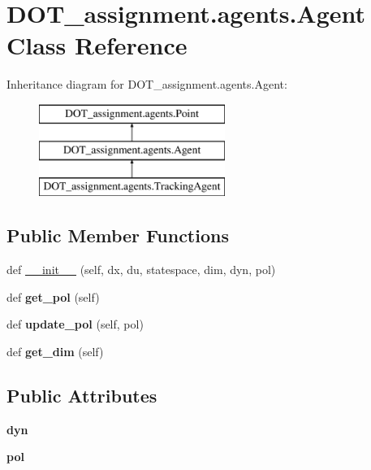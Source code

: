 \hypertarget{class_d_o_t__assignment_1_1agents_1_1_agent}{}\section{D\+O\+T\+\_\+assignment.\+agents.\+Agent Class Reference}
\label{class_d_o_t__assignment_1_1agents_1_1_agent}
Inheritance diagram for D\+O\+T\+\_\+assignment.\+agents.\+Agent\+:\begin{figure}[H]
\begin{center}
\leavevmode
\includegraphics[height=3.000000cm]{class_d_o_t__assignment_1_1agents_1_1_agent}
\end{center}
\end{figure}
\subsection*{Public Member Functions}
\begin{DoxyCompactItemize}
\item 
def \mbox{\hyperlink{class_d_o_t__assignment_1_1agents_1_1_agent_a243feb66a55d2a2733464276db763fc3}{\+\_\+\+\_\+init\+\_\+\+\_\+}} (self, dx, du, statespace, dim, dyn, pol)
\item 
\mbox{\label{class_d_o_t__assignment_1_1agents_1_1_agent_af718808f9100549cdd31fbc0b48e06f0}} 
def {\bfseries get\+\_\+pol} (self)
\item 
\mbox{\label{class_d_o_t__assignment_1_1agents_1_1_agent_a85c6b89b354a7ae61b6838b180cebe60}} 
def {\bfseries update\+\_\+pol} (self, pol)
\item 
\mbox{\label{class_d_o_t__assignment_1_1agents_1_1_agent_aa1e9d1f9f704c4016f62d907e0650877}} 
def {\bfseries get\+\_\+dim} (self)
\end{DoxyCompactItemize}
\subsection*{Public Attributes}
\begin{DoxyCompactItemize}
\item 
\mbox{\label{class_d_o_t__assignment_1_1agents_1_1_agent_ae35afbe26e60491eca55678d317dd72d}} 
{\bfseries dyn}
\item 
\mbox{\label{class_d_o_t__assignment_1_1agents_1_1_agent_a920fec108f2b787a988ae361f3d2ddd7}} 
{\bfseries pol}
\end{DoxyCompactItemize}



